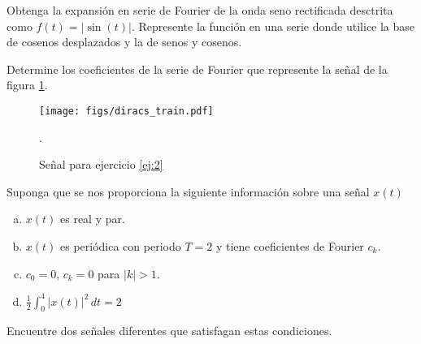 \begin{ejercicio}
Obtenga la expansión en serie de Fourier de la onda seno rectificada desctrita como $f(t)=|\sin(t)|.$ Represente la función en una serie donde utilice la base de cosenos desplazados y la de senos y cosenos.
\end{ejercicio}

\begin{ejercicio}
    \label{ej:2}
    Determine los coeficientes de la serie de Fourier que represente la señal de la figura \ref{fig:diracs}.
    \begin{figure}[!h]
        \centering
        \texttt{[image: figs/diracs\_train.pdf]}
        \caption{Señal para ejercicio \ref{ej:2}}.
        \label{fig:diracs}
    \end{figure}
\end{ejercicio}

\begin{ejercicio}
    Suponga que se nos proporciona la siguiente información sobre una señal $x(t)$
    \begin{enumerate}[a.]
        \item $x(t)$ es real y par.
        \item $x(t)$ es periódica con periodo $T=2$ y tiene coeficientes de Fourier $c_k$.
        \item $c_0=0$, $c_k=0$ para $|k|>1$.
        \item $\displaystyle\frac{1}{2}\int_0^4|x(t)|^2\,dt = 2$
    \end{enumerate}
    Encuentre dos señales diferentes que satisfagan estas condiciones.
\end{ejercicio}

